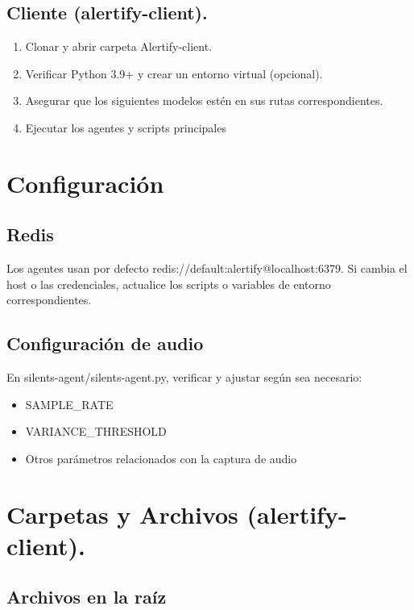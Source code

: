 \subsection*{Cliente (alertify-client).}

\begin{enumerate}
  \item Clonar y abrir carpeta Alertify-client.
  \item Verificar Python 3.9+ y crear un entorno virtual (opcional).
  \item Asegurar que los siguientes modelos estén en sus rutas correspondientes.
  \item Ejecutar los agentes y scripts principales
\end{enumerate}

\section*{Configuración}

\subsection*{Redis}

Los agentes usan por defecto redis://default:alertify@localhost:6379. Si cambia el host o las credenciales, actualice los scripts o variables de entorno correspondientes.

\subsection*{Configuración de audio}

En silents-agent/silents-agent.py, verificar y ajustar según sea necesario:

\begin{itemize}
  \item SAMPLE\_RATE
  \item VARIANCE\_THRESHOLD
  \item Otros parámetros relacionados con la captura de audio
\end{itemize}

\section*{Carpetas y Archivos (alertify-client).}

\subsection*{Archivos en la raíz}

